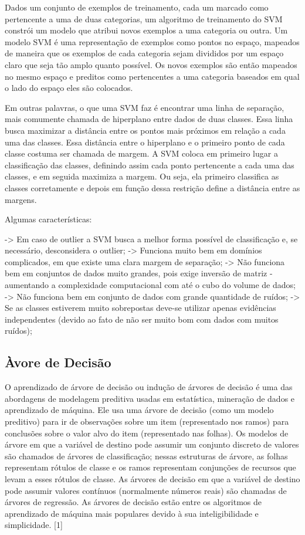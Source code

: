 \documentclass{article}
\begin{document}
Dados um conjunto de exemplos de treinamento, cada um marcado como pertencente a uma de duas categorias, um algoritmo de treinamento do SVM constrói um modelo que atribui novos exemplos a uma categoria ou outra. Um modelo SVM é uma representação de exemplos como pontos no espaço, mapeados de maneira que os exemplos de cada categoria sejam divididos por um espaço claro que seja tão amplo quanto possível. Os novos exemplos são então mapeados no mesmo espaço e preditos como pertencentes a uma categoria baseados em qual o lado do espaço eles são colocados.

Em outras palavras, o que uma SVM faz é encontrar uma linha de separação, mais comumente chamada de hiperplano entre dados de duas classes. Essa linha busca maximizar a distância entre os pontos mais próximos em relação a cada uma das classes. Essa distância entre o hiperplano e o primeiro ponto de cada classe costuma ser chamada de margem. A SVM coloca em primeiro lugar a classificação das classes, definindo assim cada ponto pertencente a cada uma das classes, e em seguida maximiza a margem. Ou seja, ela primeiro classifica as classes corretamente e depois em função dessa restrição define a distância entre as margens.

Algumas características:

-> Em caso de outlier a SVM busca a melhor forma possível de classificação e, se necessário, desconsidera o outlier;
-> Funciona muito bem em domínios complicados, em que existe uma clara margem de separação;
-> Não funciona bem em conjuntos de dados muito grandes, pois exige inversão de matriz - aumentando a complexidade computacional com até o cubo do volume de dados;
-> Não funciona bem em conjunto de dados com grande quantidade de ruídos;
-> Se as classes estiverem muito sobrepostas deve-se utilizar apenas evidências independentes (devido ao fato de não ser muito bom com dados com muitos ruídos);

\subsection{Àvore de Decisão}
O aprendizado de árvore de decisão ou indução de árvores de decisão é uma das abordagens de modelagem preditiva usadas em estatística, mineração de dados e aprendizado de máquina. Ele usa uma árvore de decisão (como um modelo preditivo) para ir de observações sobre um item (representado nos ramos) para conclusões sobre o valor alvo do item (representado nas folhas). Os modelos de árvore em que a variável de destino pode assumir um conjunto discreto de valores são chamados de árvores de classificação; nessas estruturas de árvore, as folhas representam rótulos de classe e os ramos representam conjunções de recursos que levam a esses rótulos de classe. As árvores de decisão em que a variável de destino pode assumir valores contínuos (normalmente números reais) são chamadas de árvores de regressão. As árvores de decisão estão entre os algoritmos de aprendizado de máquina mais populares devido à sua inteligibilidade e simplicidade. [1]
\end{document}
